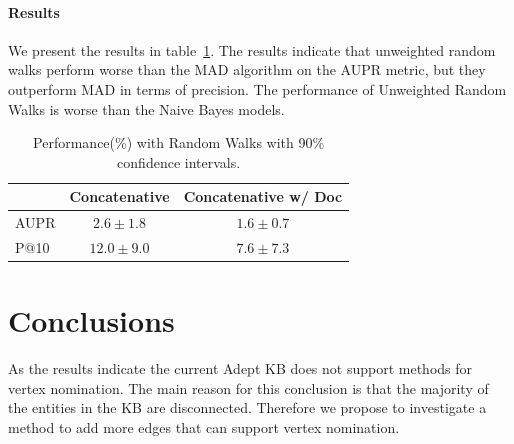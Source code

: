 \documentclass[paper=a4,fontsize=11pt]{scrartcl}
\newcommand{\tabref}[1]{table~\ref{#1}}
\numberwithin{equation}{section}    %
\numberwithin{figure}{section}      %
\numberwithin{table}{section}       %
\begin{document}
\paragraph{Results} We present the results in \tabref{tab:perf-rw}.
The results indicate that unweighted random walks perform
worse than the MAD algorithm on the AUPR metric, but they outperform MAD in terms of precision.
The performance of Unweighted Random Walks is worse than the Naive Bayes models.
\begin{table}[htbp]
  \centering
  \begin{tabular}{l | c c}
         & Concatenative & Concatenative w/ Doc \\\hline
    AUPR & $ 2.6 \pm 1.8 $       & $ 1.6 \pm 0.7 $      \\
    P@10 & $ 12.0 \pm 9.0 $      & $ 7.6 \pm 7.3 $      \\
  \end{tabular}
  \caption{Performance(\%) with Random Walks with 90\% confidence intervals.}
  \label{tab:perf-rw}
\end{table}


\section{Conclusions}
\label{sec:conclusions}
As the results indicate the current Adept KB does not support methods for vertex
nomination. The  main reason for this conclusion is that the majority of the entities in the KB are disconnected. Therefore we propose to investigate a method to add more edges that can support vertex nomination.
\end{document}
